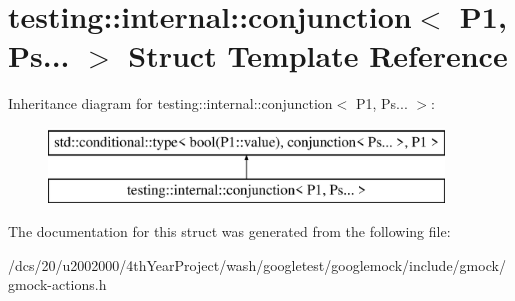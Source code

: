 \hypertarget{structtesting_1_1internal_1_1conjunction_3_01P1_00_01Ps_8_8_8_01_4}{}\section{testing\+:\+:internal\+:\+:conjunction$<$ P1, Ps... $>$ Struct Template Reference}
\label{structtesting_1_1internal_1_1conjunction_3_01P1_00_01Ps_8_8_8_01_4}
Inheritance diagram for testing\+:\+:internal\+:\+:conjunction$<$ P1, Ps... $>$\+:\begin{figure}[H]
\begin{center}
\leavevmode
\includegraphics[height=2.000000cm]{structtesting_1_1internal_1_1conjunction_3_01P1_00_01Ps_8_8_8_01_4}
\end{center}
\end{figure}


The documentation for this struct was generated from the following file\+:\begin{DoxyCompactItemize}
\item 
/dcs/20/u2002000/4th\+Year\+Project/wash/googletest/googlemock/include/gmock/gmock-\/actions.\+h\end{DoxyCompactItemize}
